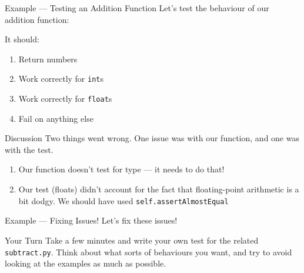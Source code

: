 \documentclass[t]{beamer}
\newcommand{\code}[1]{\texttt{#1}}
\begin{document}
	\begin{frame}{Example --- Testing an Addition Function}
		Let's test the behaviour of our addition function:
		
		
		It should:
		\begin{enumerate}
			\item Return numbers
			\item Work correctly for \code{int}s
			\item Work correctly for \code{float}s
			\item Fail on anything else
		\end{enumerate}

		\framebreak

		

		\framebreak
	
		
	\end{frame}

	\begin{frame}{Discussion}
		Two things went wrong. One issue was with our function, and one was with the test.
		\begin{enumerate}
			\item Our function doesn't test for type --- it needs to do that!
			\item Our test (floats) didn't account for the fact that floating-point arithmetic is a bit dodgy. We should have used \code{self.assertAlmostEqual}
		\end{enumerate}
	\end{frame}

	\begin{frame}{Example --- Fixing Issues!}
		Let's fix these issues!

		\framebreak

		

		

		\framebreak

		
	\end{frame}

	\begin{frame}{Your Turn}
		Take a few minutes and write your own test for the related \code{subtract.py}. Think about what sorts of behaviours you want, and try to avoid looking at the examples as much as possible.
	\end{frame}
\end{document}
